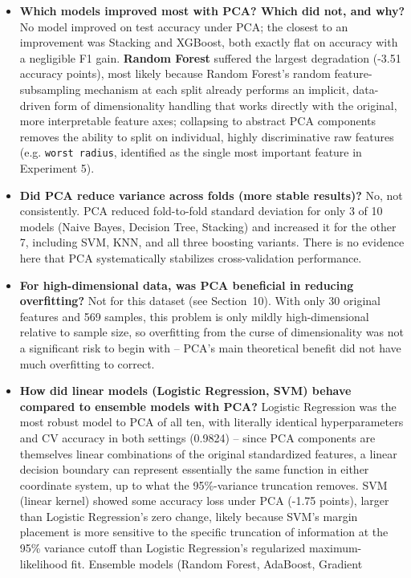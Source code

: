 \documentclass[12pt,a4paper]{article}
\DeclareRobustCommand{\_}{\textunderscore\allowbreak}
\begin{document}
\begin{itemize}
\item \textbf{Which models improved most with PCA? Which did not, and
why?} No model improved on test accuracy under PCA; the closest to an
improvement was Stacking and XGBoost, both exactly flat on accuracy with a
negligible F1 gain. \textbf{Random Forest} suffered the largest degradation
(-3.51 accuracy points), most likely because Random Forest's random
feature-subsampling mechanism at each split already performs an implicit,
data-driven form of dimensionality handling that works directly with the
original, more interpretable feature axes; collapsing to abstract PCA
components removes the ability to split on individual, highly
discriminative raw features (e.g. \texttt{worst radius}, identified as the
single most important feature in Experiment 5).
\item \textbf{Did PCA reduce variance across folds (more stable
results)?} No, not consistently. PCA reduced fold-to-fold standard
deviation for only 3 of 10 models (Naive Bayes, Decision Tree, Stacking)
and increased it for the other 7, including SVM, KNN, and all three
boosting variants. There is no evidence here that PCA systematically
stabilizes cross-validation performance.
\item \textbf{For high-dimensional data, was PCA beneficial in reducing
overfitting?} Not for this dataset (see Section~10). With only 30 original
features and 569 samples, this problem is only mildly high-dimensional
relative to sample size, so overfitting from the curse of dimensionality
was not a significant risk to begin with -- PCA's main theoretical benefit
did not have much overfitting to correct.
\item \textbf{How did linear models (Logistic Regression, SVM) behave
compared to ensemble models with PCA?} Logistic Regression was the most
robust model to PCA of all ten, with literally identical hyperparameters
and CV accuracy in both settings (0.9824) -- since PCA components are
themselves linear combinations of the original standardized features, a
linear decision boundary can represent essentially the same function in
either coordinate system, up to what the 95\%-variance truncation removes.
SVM (linear kernel) showed some accuracy loss under PCA (-1.75 points),
larger than Logistic Regression's zero change, likely because SVM's margin
placement is more sensitive to the specific truncation of information at
the 95\% variance cutoff than Logistic Regression's regularized
maximum-likelihood fit. Ensemble models (Random Forest, AdaBoost, Gradient

\end{itemize}
\end{document}
